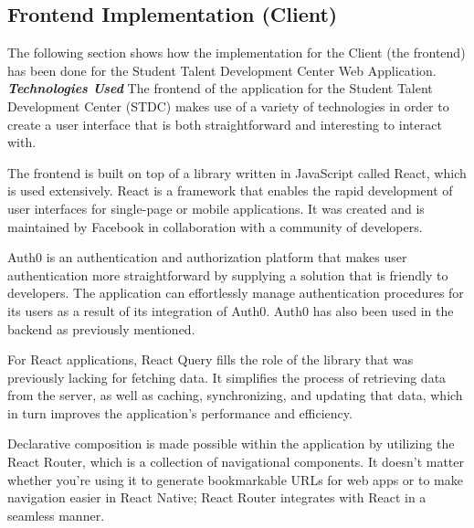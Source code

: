 \subsection{Frontend Implementation (Client)}
\begin{justify}
     The following section shows how the implementation for the Client (the frontend) has been done for the Student Talent Development Center Web Application.\\

    \vspace{0.25cm}
    \newendline \textbf{\textit{Technologies Used}}\newendline
        The frontend of the application for the Student Talent Development Center (STDC) makes use of a variety of technologies in order to create a user interface that is both straightforward and interesting to interact with.

        \vspace{0.25cm}
        \newendline The frontend is built on top of a library written in JavaScript called React, which is used extensively. React is a framework that enables the rapid development of user interfaces for single-page or mobile applications. It was created and is maintained by Facebook in collaboration with a community of developers.
        
        \vspace{0.25cm}
        \newendline Auth0 is an authentication and authorization platform that makes user authentication more straightforward by supplying a solution that is friendly to developers. The application can effortlessly manage authentication procedures for its users as a result of its integration of Auth0. Auth0 has also been used in the backend as previously mentioned.
        
        \vspace{0.25cm}
        \newendline For React applications, React Query fills the role of the library that was previously lacking for fetching data. It simplifies the process of retrieving data from the server, as well as caching, synchronizing, and updating that data, which in turn improves the application's performance and efficiency.
        
        \vspace{0.25cm}
        \newendline Declarative composition is made possible within the application by utilizing the React Router, which is a collection of navigational components. It doesn't matter whether you're using it to generate bookmarkable URLs for web apps or to make navigation easier in React Native; React Router integrates with React in a seamless manner.
        

\end{justify}

